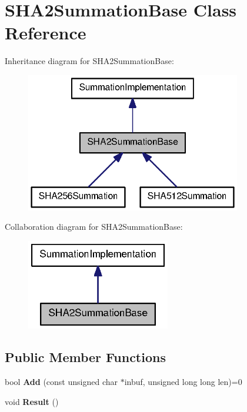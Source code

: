 \section{\-S\-H\-A2\-Summation\-Base \-Class \-Reference}
\label{classSHA2SummationBase}


\-Inheritance diagram for \-S\-H\-A2\-Summation\-Base\-:
\nopagebreak
\begin{figure}[H]
\begin{center}
\leavevmode
\includegraphics[width=266pt]{classSHA2SummationBase__inherit__graph}
\end{center}
\end{figure}


\-Collaboration diagram for \-S\-H\-A2\-Summation\-Base\-:
\nopagebreak
\begin{figure}[H]
\begin{center}
\leavevmode
\includegraphics[width=178pt]{classSHA2SummationBase__coll__graph}
\end{center}
\end{figure}
\subsection*{\-Public \-Member \-Functions}
\begin{DoxyCompactItemize}
\item 
bool {\bfseries \-Add} (const unsigned char $\ast$inbuf, unsigned long long len)=0\label{classSHA2SummationBase_a5e915d178c0c3e4832e608a739e8084a}

\item 
void {\bfseries \-Result} ()\label{classSHA2SummationBase_a781c76a8d23a4d9ef555cd093b455699}

\end{DoxyCompactItemize}
